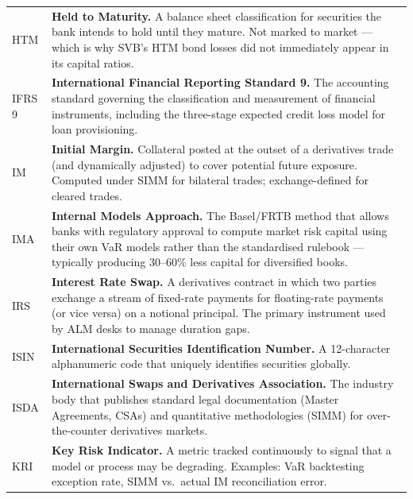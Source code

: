 \documentclass[12pt,a4paper]{article}
\begin{document}
\begin{longtable}{p{3.2cm} p{10.8cm}}
  HTM   & \textbf{Held to Maturity.}
          A balance sheet classification for securities the bank intends to
          hold until they mature.  Not marked to market --- which is why SVB's
          HTM bond losses did not immediately appear in its capital ratios. \\[4pt]

  IFRS 9 & \textbf{International Financial Reporting Standard 9.}
           The accounting standard governing the classification and measurement
           of financial instruments, including the three-stage expected credit
           loss model for loan provisioning. \\[4pt]

  IM    & \textbf{Initial Margin.}
          Collateral posted at the outset of a derivatives trade (and
          dynamically adjusted) to cover potential future exposure.
          Computed under SIMM for bilateral trades; exchange-defined
          for cleared trades. \\[4pt]

  IMA   & \textbf{Internal Models Approach.}
          The Basel/FRTB method that allows banks with regulatory approval
          to compute market risk capital using their own VaR models rather
          than the standardised rulebook --- typically producing 30--60\%
          less capital for diversified books. \\[4pt]

  IRS   & \textbf{Interest Rate Swap.}
          A derivatives contract in which two parties exchange a stream of
          fixed-rate payments for floating-rate payments (or vice versa) on
          a notional principal.  The primary instrument used by ALM desks
          to manage duration gaps. \\[4pt]

  ISIN  & \textbf{International Securities Identification Number.}
          A 12-character alphanumeric code that uniquely identifies
          securities globally. \\[4pt]

  ISDA  & \textbf{International Swaps and Derivatives Association.}
          The industry body that publishes standard legal documentation
          (Master Agreements, CSAs) and quantitative methodologies (SIMM)
          for over-the-counter derivatives markets. \\[4pt]

  KRI   & \textbf{Key Risk Indicator.}
          A metric tracked continuously to signal that a model or process
          may be degrading.  Examples: VaR backtesting exception rate,
          SIMM vs.\ actual IM reconciliation error. \\[4pt]


\end{longtable}
\end{document}
